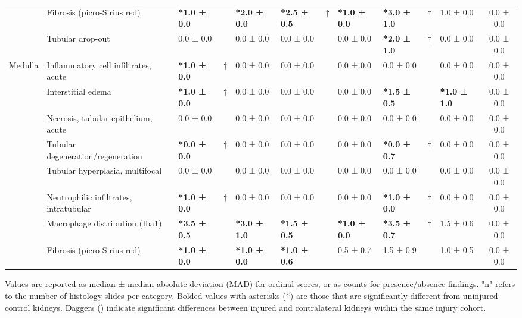 \begin{landscape}
\begin{longtable}{p{0.45in}p{1.70in}|lcl|lcl|lcl|c}
        & Fibrosis (picro-Sirius red) & \textbf{*1.0 ± 0.0} &  & \textbf{*2.0 ± 0.0} & \textbf{*2.5 ± 0.5} & † & \textbf{*1.0 ± 0.0} & \textbf{*3.0 ± 1.0} & † & 1.0 ± 0.0 & 0.0 ± 0.0 \\
        & Tubular drop-out & 0.0 ± 0.0 &  & 0.0 ± 0.0 & 0.0 ± 0.0 &  & 0.0 ± 0.0 & \textbf{*2.0 ± 1.0} & † & 0.0 ± 0.0 & 0.0 ± 0.0 \\ \hline
        Medulla & Inflammatory cell infiltrates, acute & \textbf{*1.0 ± 0.0} & † & 0.0 ± 0.0 & 0.0 ± 0.0 &  & 0.0 ± 0.0 & 0.0 ± 0.0 &  & 0.0 ± 0.0 & 0.0 ± 0.0 \\
        & Interstitial edema & \textbf{*1.0 ± 0.0} & † & 0.0 ± 0.0 & 0.0 ± 0.0 &  & 0.0 ± 0.0 & \textbf{*1.5 ± 0.5} &  & \textbf{*1.0 ± 1.0} & 0.0 ± 0.0 \\
        & Necrosis, tubular epithelium, acute & 0.0 ± 0.0 &  & 0.0 ± 0.0 & 0.0 ± 0.0 &  & 0.0 ± 0.0 & 0.0 ± 0.0 &  & 0.0 ± 0.0 & 0.0 ± 0.0 \\
        & Tubular degeneration/regeneration & \textbf{*0.0 ± 0.0} & † & 0.0 ± 0.0 & 0.0 ± 0.0 &  & 0.0 ± 0.0 & \textbf{*0.0 ± 0.7} & † & 0.0 ± 0.0 & 0.0 ± 0.0 \\
        & Tubular hyperplasia, multifocal & 0.0 ± 0.0 &  & 0.0 ± 0.0 & 0.0 ± 0.0 &  & 0.0 ± 0.0 & 0.0 ± 0.0 &  & 0.0 ± 0.0 & 0.0 ± 0.0 \\
        & Neutrophilic infiltrates, intratubular & \textbf{*1.0 ± 0.0} & † & 0.0 ± 0.0 & 0.0 ± 0.0 &  & 0.0 ± 0.0 & \textbf{*1.0 ± 0.0} & † & 0.0 ± 0.0 & 0.0 ± 0.0 \\
        & Macrophage distribution (Iba1) & \textbf{*3.5 ± 0.5} &  & \textbf{*3.0 ± 1.0} & \textbf{*1.5 ± 0.5} &  & \textbf{*1.0 ± 0.0} & \textbf{*3.5 ± 0.7} & † & 1.5 ± 0.6 & 0.0 ± 0.0 \\
        & Fibrosis (picro-Sirius red) & \textbf{*1.0 ± 0.0} &  & \textbf{*1.0 ± 0.0} & \textbf{*1.0 ± 0.6} &  & 0.5 ± 0.7 & 1.5 ± 0.9 &  & 1.0 ± 0.5 & 0.0 ± 0.0 \\ 
        \bottomrule
    \end{longtable}
    \par\vspace{0.5em}
    \noindent{}Values are reported as median ± median absolute deviation (MAD) for ordinal scores, or as counts for presence/absence findings. "n" refers to the number of histology slides per category. Bolded values with asterisks (*) are those that are significantly different from uninjured control kidneys. Daggers (\textdagger) indicate significant differences between injured and contralateral kidneys within the same injury cohort.
\end{landscape}
